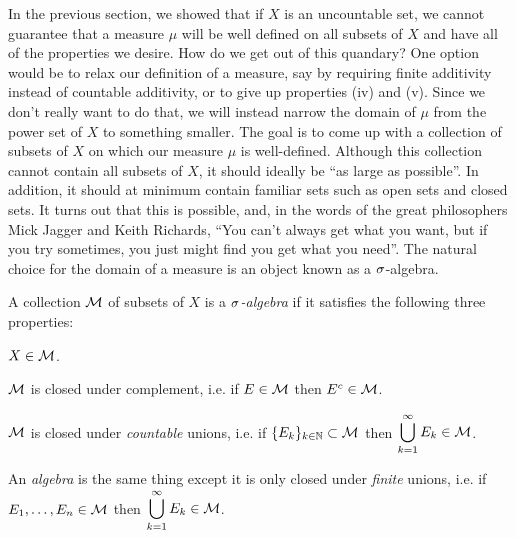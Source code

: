 \documentclass[main.tex]{subfiles}
\begin{document}
In the previous section, we showed that if $X$ is an uncountable set, we cannot guarantee that a measure $\mu$ will be well defined on all subsets of $X$ and have all of the properties we desire. How do we get out of this quandary? One option would be to relax our definition of a measure, say by requiring finite additivity instead of countable additivity, or to give up properties (iv) and (v). Since we don't really want to do that, we will instead narrow the domain of $\mu$ from the power set of $X$ to something smaller. The goal is to come up with a collection of subsets of $X$ on which our measure $\mu$ is well-defined. Although this collection cannot contain all subsets of $X$, it should ideally be ``as large as possible''. In addition, it should at minimum contain familiar sets such as open sets and closed sets. It turns out that this is possible, and, in the words of the great philosophers Mick Jagger and Keith Richards, ``You can't always get what you want, but if you try sometimes, you just might find you get what you need''. The natural choice for the domain of a measure is an object known as a ${\sigma}$-algebra.

\begin{definition}\label{def:salg}
A collection ${\mathcal M}$ of subsets of $X$ is a \emph{${\sigma}$-algebra} if it satisfies the following three properties:
\begin{romannum}
	\item $X \in {\mathcal M}$.
	\item ${\mathcal M}$ is closed under complement, i.e. if $E \in {\mathcal M}$ then $E^c \in {\mathcal M}$.
	\item ${\mathcal M}$ is closed under \emph{countable} unions, i.e. if $\{E_k\}_{k \in {\mathbb N}} \subset {\mathcal M}$ then $\begin{aligned}\bigcup_{k=1}^\infty E_k \in {\mathcal M} \end{aligned}$.
	
\end{romannum}
An \emph{algebra} is the same thing except it is only closed under \emph{finite} unions, i.e. if $E_1, \dots, E_n \in {\mathcal M}$ then $\begin{aligned}\bigcup_{k=1}^\infty E_k \in {\mathcal M} \end{aligned}$.
\end{definition}
\end{document}
